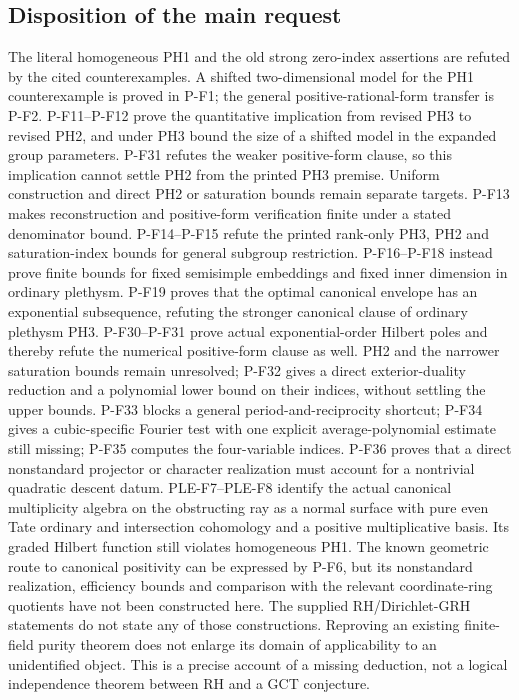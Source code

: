 \subsection{Disposition of the main request}
The literal homogeneous PH1 and the old strong zero-index assertions
are refuted by the cited counterexamples. A shifted two-dimensional
model for the PH1 counterexample is proved in P-F1; the general
positive-rational-form transfer is P-F2. P-F11--P-F12 prove the
quantitative implication from revised PH3 to revised PH2, and under
PH3 bound the size of a shifted model in the expanded group parameters.
P-F31 refutes the weaker positive-form clause, so this implication
cannot settle PH2 from the printed PH3 premise. Uniform construction
and direct PH2 or saturation bounds remain separate targets. P-F13 makes reconstruction and positive-form verification
finite under a stated denominator bound. P-F14--P-F15 refute the
printed rank-only PH3, PH2 and saturation-index bounds for general
subgroup restriction. P-F16--P-F18 instead prove finite bounds for
fixed semisimple embeddings and fixed inner dimension in ordinary
plethysm. P-F19 proves that the optimal canonical envelope has an
exponential subsequence, refuting the stronger canonical clause of
ordinary plethysm PH3. P-F30--P-F31 prove actual exponential-order
Hilbert poles and thereby refute the numerical positive-form clause
as well. PH2 and the narrower saturation bounds remain unresolved;
P-F32 gives a direct exterior-duality reduction and a polynomial
lower bound on their indices, without settling the upper bounds.
P-F33 blocks a general period-and-reciprocity shortcut; P-F34 gives
a cubic-specific Fourier test with one explicit average-polynomial
estimate still missing; P-F35 computes the four-variable indices.
P-F36 proves that a direct nonstandard projector or character
realization must account for a nontrivial quadratic descent datum.
PLE-F7--PLE-F8 identify the actual canonical multiplicity algebra on
the obstructing ray as a normal surface with pure even Tate ordinary
and intersection cohomology and a positive multiplicative basis.
Its graded Hilbert function still violates homogeneous PH1.
The known geometric route to
canonical positivity can be expressed by P-F6, but its nonstandard
realization, efficiency bounds and comparison with the relevant
coordinate-ring quotients have not been constructed here.
The supplied RH/Dirichlet-GRH statements do not state any of those
constructions. Reproving an existing finite-field purity theorem does
not enlarge its domain of applicability to an unidentified object.
This is a precise account of a missing deduction, not a logical
independence theorem between RH and a GCT conjecture.

